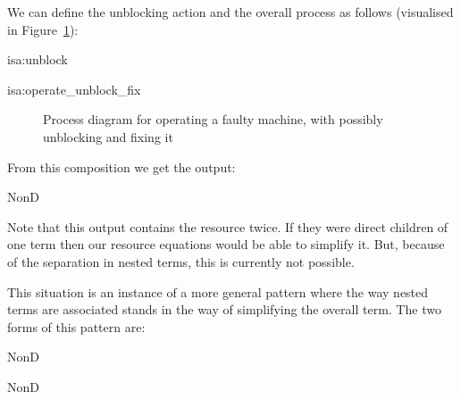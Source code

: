 \documentclass[class=smolathesis,crop=false]{standalone}
\begin{document}
We can define the unblocking action and the overall process as follows (visualised in Figure~\ref{fig:operate_unblock_fix}):
\begin{isadef}{isa:unblock}
  
\end{isadef}
\pagebreak
\begin{isadef}{isa:operate_unblock_fix}
  
\end{isadef}

\begin{figure}[htbp]
  
  \caption{Process diagram for operating a faulty machine, with possibly unblocking and fixing it}
  \label{fig:operate_unblock_fix}
\end{figure}

From this composition we get the output:
\begin{center}
  \begin{minipage}{0.6\textwidth}
    \begin{isabelle}
      NonD\ \isanewline
      \isanewline
    \end{isabelle}
  \end{minipage}
\end{center}

Note that this output contains the resource  twice.
If they were direct children of one  term then our resource equations would be able to simplify it.
But, because of the separation in nested  terms, this is currently not possible.

This situation is an instance of a more general pattern where the way nested  terms are associated stands in the way of simplifying the overall term.
The two forms of this pattern are:
\begin{isabelle}
\centering
  NonD\ \ \ 
\item
  NonD\ \ \ 
\end{isabelle}
\end{document}

